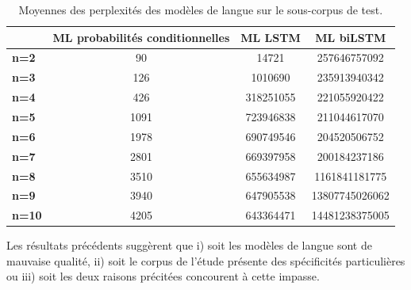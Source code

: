 \documentclass[10pt,twoside]{article}
\begin{document}
    \begin{table}[h]
    \begin{footnotesize}
    \begin{center}
    \begin{tabular}{|l|c|c|c|}
    \hline
                  & \textbf{ML probabilités conditionnelles} & \multicolumn{1}{r|}{\textbf{ML LSTM}} & \textbf{ML biLSTM} \\ \hline
    \textbf{n=2}  & 90                                       & 14721                                 & 257646757092       \\ \hline
    \textbf{n=3}  & 126                                      & 1010690                               & 235913940342       \\ \hline
    \textbf{n=4}  & 426                                      & 318251055                             & 221055920422       \\ \hline
    \textbf{n=5}  & 1091                                     & 723946838                             & 211044617070       \\ \hline
    \textbf{n=6}  & 1978                                     & 690749546                             & 204520506752       \\ \hline
    \textbf{n=7}  & 2801                                     & 669397958                             & 200184237186       \\ \hline
    \textbf{n=8}  & 3510                                     & 655634987                             & 1161841181775      \\ \hline
    \textbf{n=9}  & 3940                                     & 647905538                             & 13807745026062     \\ \hline
    \textbf{n=10} & 4205                                     & 643364471                             & 14481238375005     \\ \hline
    \end{tabular}\caption{Moyennes des perplexités des modèles de langue sur le sous-corpus de test.}\label{tab:perplex}
    \end{center}
    \end{footnotesize}
    \end{table}


    Les résultats précédents suggèrent que i) soit les modèles de langue sont de mauvaise qualité, ii) soit le corpus de l'étude présente des spécificités particulières 
    ou iii) soit les deux raisons précitées concourent à cette impasse.
\end{document}
